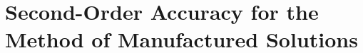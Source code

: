 \documentclass[preprint,12pt]{elsarticle}
\begin{document}

\section{Second-Order Accuracy for the Method of Manufactured Solutions}
\label{sec:OrderAccuracy}
\end{document}
